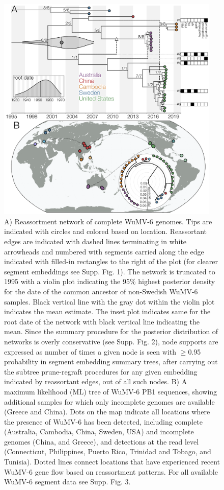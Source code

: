 \documentclass[11pt,twocolumn]{article}
\begin{document}
\begin{figure}
  \centering
  \includegraphics[width=0.95\textwidth]{Fig1_tracking.png}
  \caption{
    A) Reassortment network of complete WuMV-6 genomes. Tips are indicated with circles and colored based on location. Reassortant edges are indicated with dashed lines terminating in white arrowheads and numbered with segments carried along the edge indicated with filled-in rectangles to the right of the plot (for clearer segment embeddings see Supp. Fig. 1). The network is truncated to 1995 with a violin plot indicating the 95\% highest posterior density for the date of the common ancestor of non-Swedish WuMV-6 samples. Black vertical line with the gray dot within the violin plot indicates the mean estimate. The inset plot indicates same for the root date of the network with black vertical line indicating the mean. Since the summary procedure for the posterior distribution of networks is overly conservative (see Supp. Fig. 2), node supports are expressed as number of times a given node is seen with $\geq$0.95 probability in segment embedding summary trees, after carrying out the subtree prune-regraft procedures for any given embedding indicated by reassortant edges, out of all such nodes.
    B) A maximum likelihood (ML) tree of WuMV-6 PB1 sequences, showing additional samples for which only incomplete genomes are available (Greece and China). Dots on the map indicate all locations where the presence of WuMV-6 has been detected, including complete (Australia, Cambodia, China, Sweden, USA) and incomplete genomes (China, and Greece), and detections at the read level (Connecticut, Philippines, Puerto Rico, Trinidad and Tobago, and Tunisia). Dotted lines connect locations that have experienced recent WuMV-6 gene flow based on reassortment patterns. For all available WuMV-6 segment data see Supp. Fig. 3.
    }
    \label{fig:tracking}
\end{figure}
\end{document}
